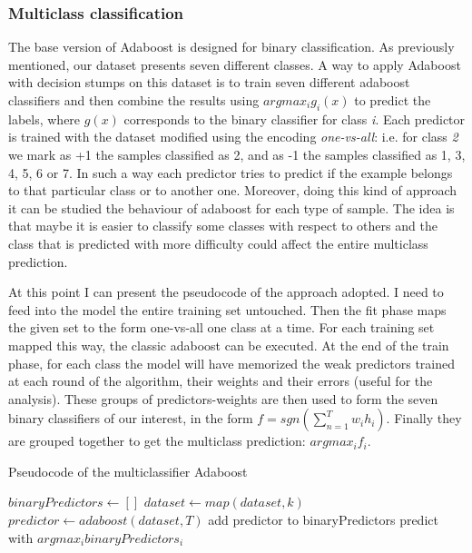 \documentclass{scrartcl}
\begin{document}
\subsubsection{Multiclass classification}
The base version of Adaboost is designed for binary classification. As previously mentioned, our dataset presents seven different classes. A way to apply Adaboost with decision stumps on this dataset is to train seven different adaboost classifiers and then combine the results using $ argmax_{i}g_{i}(x) $ to predict the labels, where $ g(x) $ corresponds to the binary classifier for class \textit{i}. Each predictor is trained with the dataset modified using the encoding \textit{one-vs-all}: i.e. for class \textit{2} we mark as +1 the samples classified as 2, and as -1 the samples classified as 1, 3, 4, 5, 6 or 7. In such a way each predictor tries to predict if the example belongs to that particular class or to another one. Moreover, doing this kind of approach it can be studied the behaviour of adaboost for each type of sample. The idea is that maybe it is easier to classify some classes with respect to others and the class that is predicted with more difficulty could affect the entire multiclass prediction.

At this point I can present the pseudocode of the approach adopted. I need to feed into the model the entire training set untouched. Then the fit phase maps the given set to the form one-vs-all one class at a time. For each training set mapped this way, the classic adaboost can be executed. At the end of the train phase, for each class the model will have memorized the weak predictors trained at each round of the algorithm, their weights and their errors (useful for the analysis). These groups of predictors-weights are then used to form the seven binary classifiers of our interest, in the form $f = sgn(\sum_{n=1}^{T} w_i h_i) $. Finally they are grouped together to get the multiclass prediction: $ argmax_{i}f_{i} $.

\begin{algorithm}
\caption{Pseudocode of the multiclassifier Adaboost}\label{alg:cap}
\begin{algorithmic}
\State $binaryPredictors \gets [ ]$
    \State $dataset \gets map(dataset, k)$
    \State $predictor \gets adaboost(dataset, T)$
    \State  add predictor to binaryPredictors
\EndFor
\State \Return predict with $ argmax_{i}binaryPredictors_{i}$
\end{algorithmic}
\end{algorithm}
\end{document}

